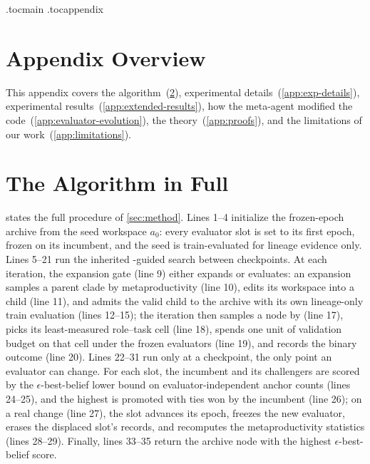 \clearpage
\raggedbottom
{}
\label{sec:appendix}
\etocdepthtag.toc{main}
\etocdepthtag.toc{appendix}

\vspace{0.8cm}
\begingroup
  \hypersetup{linkcolor=black}
  \color{black}
  \tableofcontents
\endgroup
\vspace{0.8\baselineskip}

\section{Appendix Overview}
This appendix covers the \ourmethod algorithm~(\cref{app:algo}), experimental details~(\cref{app:exp-details}), experimental results~(\cref{app:extended-results}), how the meta-agent modified the code~(\cref{app:evaluator-evolution}), the theory~(\cref{app:proofs}), and the limitations of our work~(\cref{app:limitations}).


\section{The Algorithm in Full}
\label{app:algo}

 states the full \ourmethod{} procedure of \cref{sec:method}. Lines 1--4 initialize the frozen-epoch archive from the seed workspace $a_0$: every evaluator slot is set to its first epoch, frozen on its incumbent, and the seed is train-evaluated for lineage evidence only. Lines 5--21 run the inherited \cmp-guided search between checkpoints. At each iteration, the expansion gate (line 9) either expands or evaluates: an expansion samples a parent clade by metaproductivity (line 10), edits its workspace into a child (line 11), and admits the valid child to the archive with its own lineage-only train evaluation (lines 12--15); the iteration then samples a node by \cmp (line 17), picks its least-measured role--task cell (line 18), spends one unit of validation budget on that cell under the frozen evaluators (line 19), and records the binary outcome (line 20). Lines 22--31 run only at a checkpoint, the only point an evaluator can change. For each slot, the incumbent and its challengers are scored by the $\epsilon$-best-belief lower bound on evaluator-independent anchor counts (lines 24--25), and the highest is promoted with ties won by the incumbent (line 26); on a real change (line 27), the slot advances its epoch, freezes the new evaluator, erases the displaced slot's records, and recomputes the metaproductivity statistics (lines 28--29). Finally, lines 33--35 return the archive node with the highest $\epsilon$-best-belief score.

